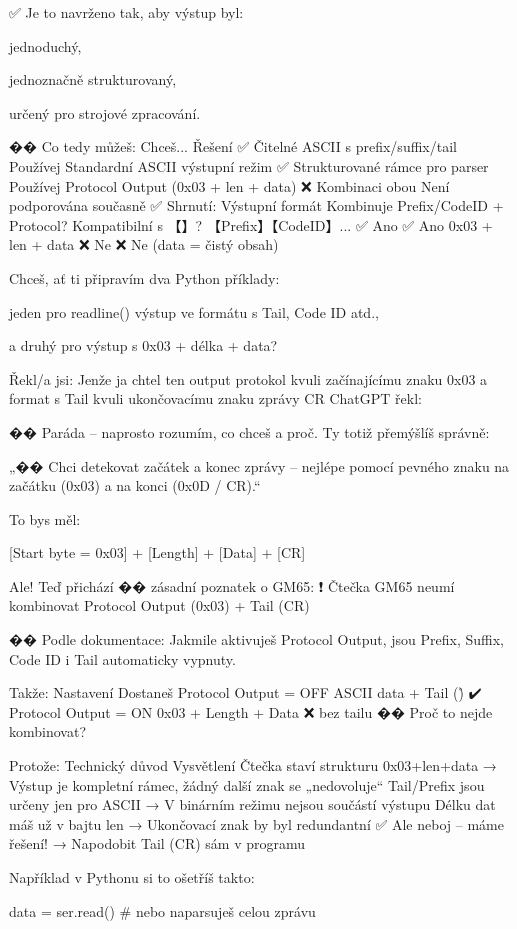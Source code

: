 ✅ Je to navrženo tak, aby výstup byl:

    jednoduchý,

    jednoznačně strukturovaný,

    určený pro strojové zpracování.

�� Co tedy můžeš:
Chceš...	Řešení
✅ Čitelné ASCII s prefix/suffix/tail	Používej Standardní ASCII výstupní režim
✅ Strukturované rámce pro parser	Používej Protocol Output (0x03 + len + data)
❌ Kombinaci obou	Není podporována současně
✅ Shrnutí:
Výstupní formát	Kombinuje Prefix/CodeID + Protocol?	Kompatibilní s 【】?
【Prefix】【CodeID】...	✅ Ano	✅ Ano
0x03 + len + data	❌ Ne	❌ Ne (data = čistý obsah)

Chceš, ať ti připravím dva Python příklady:

    jeden pro readline() výstup ve formátu s Tail, Code ID atd.,

    a druhý pro výstup s 0x03 + délka + data?

Řekl/a jsi:
Jenže ja chtel ten output protokol kvuli začínajícímu znaku 0x03 a format s Tail kvuli ukončovacímu znaku zprávy CR
ChatGPT řekl:

�� Paráda – naprosto rozumím, co chceš a proč.
Ty totiž přemýšlíš správně:

    „�� Chci detekovat začátek a konec zprávy – nejlépe pomocí pevného znaku na začátku (0x03) a na konci (0x0D / CR).“

To bys měl:

[Start byte = 0x03] + [Length] + [Data] + [CR]

Ale! Teď přichází �� zásadní poznatek o GM65:
❗ Čtečka GM65 neumí kombinovat Protocol Output (0x03) + Tail (CR)

    �� Podle dokumentace:
    Jakmile aktivuješ Protocol Output, jsou Prefix, Suffix, Code ID i Tail automaticky vypnuty.

Takže:
Nastavení	Dostaneš
Protocol Output = OFF	ASCII data + Tail (\r) ✔️
Protocol Output = ON	0x03 + Length + Data ❌ bez tailu
�� Proč to nejde kombinovat?

Protože:
Technický důvod	Vysvětlení
Čtečka staví strukturu 0x03+len+data	→ Výstup je kompletní rámec, žádný další znak se „nedovoluje“
Tail/Prefix jsou určeny jen pro ASCII	→ V binárním režimu nejsou součástí výstupu
Délku dat máš už v bajtu len	→ Ukončovací znak by byl redundantní
✅ Ale neboj – máme řešení!
→ Napodobit Tail (CR) sám v programu

Například v Pythonu si to ošetříš takto:

data = ser.read()  # nebo naparsuješ celou zprávu

